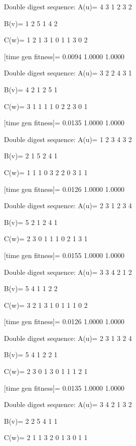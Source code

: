 Double digest sequence:
A(u)=
     4     3     1     2     3     2

B(v)=
     1     2     5     1     4     2

C(w)=
     1     2     1     3     1     0     1     1     3     0     2

[time gen fitness]=
    0.0094    1.0000    1.0000

Double digest sequence:
A(u)=
     3     2     2     4     3     1

B(v)=
     4     2     1     2     5     1

C(w)=
     3     1     1     1     1     0     2     2     3     0     1

[time gen fitness]=
    0.0135    1.0000    1.0000

Double digest sequence:
A(u)=
     1     2     3     4     3     2

B(v)=
     2     1     5     2     4     1

C(w)=
     1     1     1     0     3     2     2     0     3     1     1

[time gen fitness]=
    0.0126    1.0000    1.0000

Double digest sequence:
A(u)=
     2     3     1     2     3     4

B(v)=
     5     2     1     2     4     1

C(w)=
     2     3     0     1     1     1     0     2     1     3     1

[time gen fitness]=
    0.0155    1.0000    1.0000

Double digest sequence:
A(u)=
     3     3     4     2     1     2

B(v)=
     5     4     1     1     2     2

C(w)=
     3     2     1     3     1     0     1     1     1     0     2

[time gen fitness]=
    0.0126    1.0000    1.0000

Double digest sequence:
A(u)=
     2     3     1     3     2     4

B(v)=
     5     4     1     2     2     1

C(w)=
     2     3     0     1     3     0     1     1     1     2     1

[time gen fitness]=
    0.0135    1.0000    1.0000

Double digest sequence:
A(u)=
     3     4     2     1     3     2

B(v)=
     2     2     5     4     1     1

C(w)=
     2     1     1     3     2     0     1     3     0     1     1

